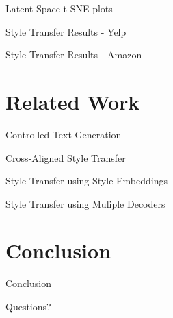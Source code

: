 \documentclass[aspectratio=169]{beamer}
\begin{document}
\begin{frame}{Latent Space t-SNE plots}
\end{frame}

\begin{frame}{Style Transfer Results - Yelp}
\end{frame}

\begin{frame}{Style Transfer Results - Amazon}
\end{frame}

% 

\section{Related Work}

\begin{frame}{Controlled Text Generation}
\end{frame}

\begin{frame}{Cross-Aligned Style Transfer}
\end{frame}

\begin{frame}{Style Transfer using Style Embeddings}
\end{frame}

\begin{frame}{Style Transfer using Muliple Decoders}
\end{frame}

% 

\section{Conclusion}

\begin{frame}{Conclusion}
\end{frame}

\begin{frame}[allowframebreaks]
	
	
\end{frame}

\begin{frame}
	\centering
	\Huge{Questions?}
\end{frame}
\end{document}
